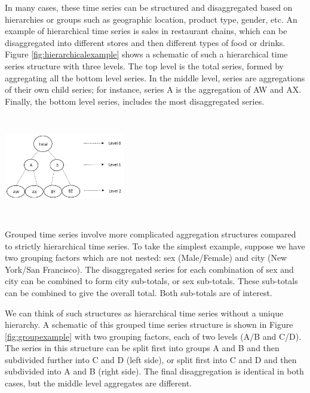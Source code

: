 \documentclass[11pt,a4paper,]{article}
\let\origfigure\figure
\let\endorigfigure\endfigure
\renewenvironment{figure}[1][2] {
    \expandafter\origfigure\expandafter[!htbp]
} {
    \endorigfigure
}
\begin{document}
In many cases, these time series can be structured and disaggregated based on hierarchies or groups such as geographic location, product type, gender, etc. An example of hierarchical time series is sales in restaurant chains, which can be disaggregated into different stores and then different types of food or drinks. Figure \ref{fig:hierarchicalexample} shows a schematic of such a hierarchical time series structure with three levels. The top level is the total series, formed by aggregating all the bottom level series. In the middle level, series are aggregations of their own child series; for instance, series A is the aggregation of AW and AX. Finally, the bottom level series, includes the most disaggregated series.

\begin{figure}

{\centering \includegraphics[width=200px,height=170px,trim=0 0 190 0,clip=true]{Paper-Figures/hierarchical_example} 

}

\caption{An example of a two level hierarchical structure.}\label{fig:hierarchicalexample}
\end{figure}

Grouped time series involve more complicated aggregation structures compared to strictly hierarchical time series. To take the simplest example, suppose we have two grouping factors which are not nested: sex (Male/Female) and city (New York/San Francisco). The disaggregated series for each combination of sex and city can be combined to form city sub-totals, or sex sub-totals. These sub-totals can be combined to give the overall total. Both sub-totals are of interest.

We can think of such structures as hierarchical time series without a unique hierarchy. A schematic of this grouped time series structure is shown in Figure \ref{fig:groupexample} with two grouping factors, each of two levels (A/B and C/D). The series in this structure can be split first into groups A and B and then subdivided further into C and D (left side), or split first into C and D and then subdivided into A and B (right side). The final disaggregation is identical in both cases, but the middle level aggregates are different.
\end{document}
